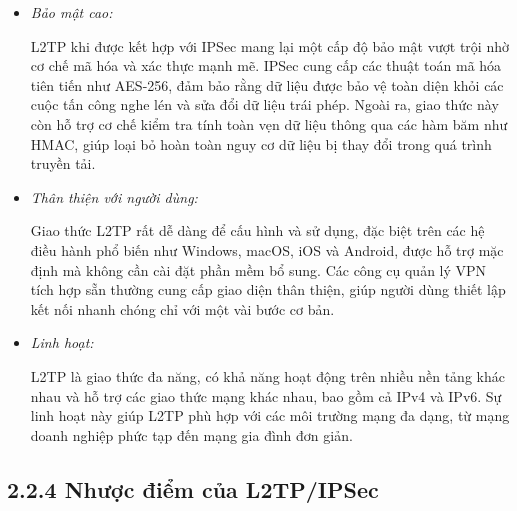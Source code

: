    \begin{itemize}
        \item \textit{Bảo mật cao:}
        
        L2TP khi được kết hợp với IPSec mang lại một cấp độ bảo mật vượt trội nhờ cơ chế mã hóa và xác thực mạnh mẽ. IPSec cung cấp các thuật toán mã hóa tiên tiến như AES-256, đảm bảo rằng dữ liệu được bảo vệ toàn diện khỏi các cuộc tấn công nghe lén và sửa đổi dữ liệu trái phép. Ngoài ra, giao thức này còn hỗ trợ cơ chế kiểm tra tính toàn vẹn dữ liệu thông qua các hàm băm như HMAC, giúp loại bỏ hoàn toàn nguy cơ dữ liệu bị thay đổi trong quá trình truyền tải.
        \item \textit{Thân thiện với người dùng:}

        Giao thức L2TP rất dễ dàng để cấu hình và sử dụng, đặc biệt trên các hệ điều hành phổ biến như Windows, macOS, iOS và Android, được hỗ trợ mặc định mà không cần cài đặt phần mềm bổ sung. Các công cụ quản lý VPN tích hợp sẵn thường cung cấp giao diện thân thiện, giúp người dùng thiết lập kết nối nhanh chóng chỉ với một vài bước cơ bản.

        \item \textit{Linh hoạt:}

        L2TP là giao thức đa năng, có khả năng hoạt động trên nhiều nền tảng khác nhau và hỗ trợ các giao thức mạng khác nhau, bao gồm cả IPv4 và IPv6. Sự linh hoạt này giúp L2TP phù hợp với các môi trường mạng đa dạng, từ mạng doanh nghiệp phức tạp đến mạng gia đình đơn giản. 
    \end{itemize} 
 \subsection*{2.2.4 Nhược điểm của L2TP/IPSec}

